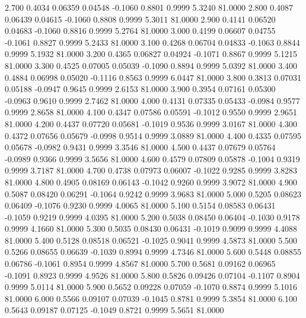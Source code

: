    2.700   0.4034   0.06359   0.04548  -0.1060   0.8801   0.9999   5.3240  81.0000
   2.800   0.4087   0.06439   0.04615  -0.1060   0.8808   0.9999   5.3011  81.0000
   2.900   0.4141   0.06520   0.04683  -0.1060   0.8816   0.9999   5.2764  81.0000
   3.000   0.4199   0.06607   0.04755  -0.1061   0.8827   0.9999   5.2433  81.0000
   3.100   0.4268   0.06704   0.04833  -0.1063   0.8844   0.9999   5.1932  81.0000
   3.200   0.4365   0.06827   0.04924  -0.1071   0.8867   0.9999   5.1215  81.0000
   3.300   0.4525   0.07005   0.05039  -0.1090   0.8894   0.9999   5.0392  81.0000
   3.400   0.4884   0.06998   0.05020  -0.1116   0.8563   0.9999   6.0447  81.0000
   3.800   0.3813   0.07031   0.05188  -0.0947   0.9645   0.9999   2.6153  81.0000
   3.900   0.3954   0.07161   0.05300  -0.0963   0.9610   0.9999   2.7462  81.0000
   4.000   0.4131   0.07335   0.05433  -0.0984   0.9577   0.9999   2.8658  81.0000
   4.100   0.4347   0.07586   0.05591  -0.1012   0.9550   0.9999   2.9651  81.0000
   4.200   0.4437   0.07720   0.05681  -0.1019   0.9536   0.9999   3.0167  81.0000
   4.300   0.4372   0.07656   0.05679  -0.0998   0.9514   0.9999   3.0889  81.0000
   4.400   0.4335   0.07595   0.05678  -0.0982   0.9431   0.9999   3.3546  81.0000
   4.500   0.4437   0.07679   0.05764  -0.0989   0.9366   0.9999   3.5656  81.0000
   4.600   0.4579   0.07809   0.05878  -0.1004   0.9319   0.9999   3.7187  81.0000
   4.700   0.4738   0.07973   0.06007  -0.1022   0.9285   0.9999   3.8283  81.0000
   4.800   0.4905   0.08169   0.06143  -0.1042   0.9260   0.9999   3.9072  81.0000
   4.900   0.5087   0.08420   0.06291  -0.1064   0.9242   0.9999   3.9683  81.0000
   5.000   0.5205   0.08623   0.06409  -0.1076   0.9230   0.9999   4.0065  81.0000
   5.100   0.5154   0.08583   0.06431  -0.1059   0.9219   0.9999   4.0395  81.0000
   5.200   0.5038   0.08450   0.06404  -0.1030   0.9178   0.9999   4.1660  81.0000
   5.300   0.5035   0.08430   0.06431  -0.1019   0.9099   0.9999   4.4088  81.0000
   5.400   0.5128   0.08518   0.06521  -0.1025   0.9041   0.9999   4.5873  81.0000
   5.500   0.5266   0.08655   0.06639  -0.1039   0.8994   0.9999   4.7346  81.0000
   5.600   0.5448   0.08855   0.06786  -0.1061   0.8954   0.9999   4.8567  81.0000
   5.700   0.5681   0.09162   0.06965  -0.1091   0.8923   0.9999   4.9526  81.0000
   5.800   0.5826   0.09426   0.07104  -0.1107   0.8904   0.9999   5.0114  81.0000
   5.900   0.5652   0.09228   0.07059  -0.1070   0.8874   0.9999   5.1016  81.0000
   6.000   0.5566   0.09107   0.07039  -0.1045   0.8781   0.9999   5.3854  81.0000
   6.100   0.5643   0.09187   0.07125  -0.1049   0.8721   0.9999   5.5651  81.0000
